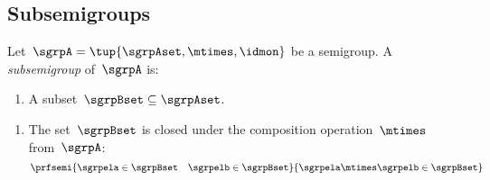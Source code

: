
\subsection{Subsemigroups}


\begin{definition}
    Let~$\sgrpA = \tup{\sgrpAset, \mtimes, \idmon}$ be a semigroup.
    A \emph{subsemigroup} of~$\sgrpA$ is:

    \constit

    \begin{enumerate}
        \item A subset~$\sgrpBset \subseteq \sgrpAset$.
    \end{enumerate}

    \condit

    \begin{enumerate}
        \item The set~$\sgrpBset$ is closed under the composition operation~$\mtimes$ from~$\sgrpA$:
              \begin{equation}
                  \prfsemi{\sgrpela \in \sgrpBset \quad \sgrpelb \in \sgrpBset}{\sgrpela \mtimes \sgrpelb \in \sgrpBset}
              \end{equation}
    \end{enumerate}
\end{definition}


